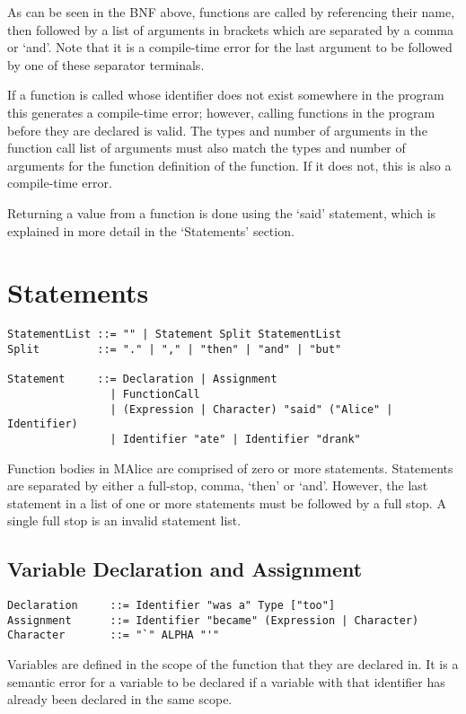 \documentclass[a4wide, 11pt]{article}
\begin{document}
As can be seen in the BNF above, functions are called by referencing their name, then followed by a list of arguments in brackets which are separated by a comma or `and'. Note that it is a compile-time error for the last argument to be followed by one of these separator terminals.

If a function is called whose identifier does not exist somewhere in the program this generates a compile-time error; however, calling functions in the program before they are declared is valid. The types and number of arguments in the function call list of arguments must also match the types and number of arguments for the function definition of the function. If it does not, this is also a compile-time error.

Returning a value from a function is done using the `said' statement, which is explained in more detail in the `Statements' section.

\section{Statements}

\begin{verbatim}
StatementList ::= "" | Statement Split StatementList
Split         ::= "." | "," | "then" | "and" | "but"

Statement     ::= Declaration | Assignment
                | FunctionCall
                | (Expression | Character) "said" ("Alice" | Identifier)
                | Identifier "ate" | Identifier "drank"
\end{verbatim}

Function bodies in MAlice are comprised of zero or more statements. Statements are separated by either a full-stop, comma, `then' or `and'. However, the last statement in a list of one or more statements must be followed by a full stop. A single full stop is an invalid statement list.

\subsection{Variable Declaration and Assignment}

\begin{verbatim}
Declaration     ::= Identifier "was a" Type ["too"]
Assignment      ::= Identifier "became" (Expression | Character)
Character       ::= "`" ALPHA "'"
\end{verbatim}

Variables are defined in the scope of the function that they are declared in. It is a semantic error for a variable to be declared if a variable with that identifier has already been declared in the same scope.
\end{document}
